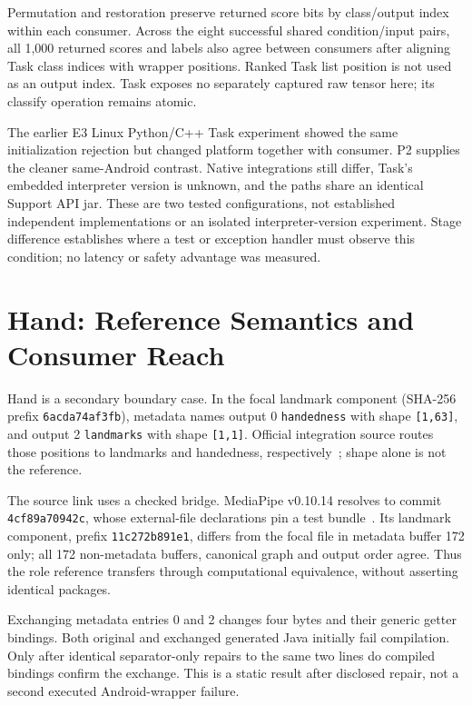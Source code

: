 \documentclass[10pt,conference]{IEEEtran}
\newcommand{\code}[1]{\texttt{#1}}
\begin{document}
Permutation and restoration preserve returned score bits by class/output index within each consumer. Across the eight successful shared condition/input pairs, all 1,000 returned scores and labels also agree between consumers after aligning Task class indices with wrapper positions. Ranked Task list position is not used as an output index. Task exposes no separately captured raw tensor here; its classify operation remains atomic.

The earlier E3 Linux Python/C++ Task experiment showed the same initialization rejection but changed platform together with consumer. P2 supplies the cleaner same-Android contrast. Native integrations still differ, Task's embedded interpreter version is unknown, and the paths share an identical Support API jar. These are two tested configurations, not established independent implementations or an isolated interpreter-version experiment. Stage difference establishes where a test or exception handler must observe this condition; no latency or safety advantage was measured.

\section{Hand: Reference Semantics and Consumer Reach}
\label{sec:hand}
Hand is a secondary boundary case. In the focal landmark component (SHA-256 prefix \code{6acda74af3fb}), metadata names output 0 \code{handedness} with shape \code{[1,63]}, and output 2 \code{landmarks} with shape \code{[1,1]}. Official integration source routes those positions to landmarks and handedness, respectively~\cite{hand-graph}; shape alone is not the reference.

The source link uses a checked bridge. MediaPipe v0.10.14 resolves to commit \code{4cf89a70942c}, whose external-file declarations pin a test bundle~\cite{hand-assets}. Its landmark component, prefix \code{11c272b891e1}, differs from the focal file in metadata buffer 172 only; all 172 non-metadata buffers, canonical graph and output order agree. Thus the role reference transfers through computational equivalence, without asserting identical packages.

Exchanging metadata entries 0 and 2 changes four bytes and their generic getter bindings. Both original and exchanged generated Java initially fail compilation. Only after identical separator-only repairs to the same two lines do compiled bindings confirm the exchange. This is a static result after disclosed repair, not a second executed Android-wrapper failure.
\end{document}
